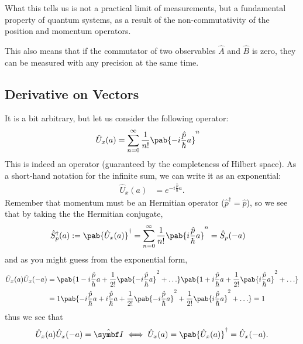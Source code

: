What this tells us is not a practical limit of measurements, but a fundamental property of quantum systems, as a result of the non-commutativity of the position and momentum operators.

This also means that if the commutator of two observables $\hat{A}$ and $\hat{B}$ is zero, they can be measured with any precision at the same time.



\subsection{Derivative on Vectors}
It is a bit arbitrary, but let us consider the following operator:
\begin{align}
  \hat{U}_x (a) & = \sum_{n=0}^{\infty} \frac{1}{n!} \pab{- i \frac{\hat{p}}{\hbar} a}^n
\end{align}
This is indeed an operator (guaranteed by the completeness of Hilbert space).
As a short-hand notation for the infinite sum, we can write it as an exponential:
\begin{align}
  \hat{U}_x (a) & = e^{- i \frac{\hat{p}}{\hbar} a}.
\end{align}
Remember that momentum must be an Hermitian operator ($\hat{p}^\dagger = \hat{p}$), so we  see that by taking the the Hermitian conjugate,
\begin{align}
  \hat{S}^\dagger_p (a): = \pab{\hat{U}_x (a)}^\dagger & = \sum_{n=0}^{\infty} \frac{1}{n!} \pab{i \frac{\hat{p}}{\hbar} a}^n = \hat{S}_{p} (- a)
\end{align}
and as you might guess from the exponential form,
\begin{align}
  \hat{U}_x(a) \hat{U}_x (-a)
   & = \pab{1 - i \frac{\hat{p}}{h} a + \frac{1}{2!} \pab{- i \frac{\hat{p}}{\hbar} a}^2 + \ldots} \pab{1 + i \frac{\hat{p}}{\hbar} a + \frac{1}{2!} \pab{i \frac{\hat{p}}{\hbar} a}^2 + \ldots} \\
   & = 1 \pab{- i \frac{\hat{p}}{\hbar} a + i \frac{\hat{p}}{\hbar} a + \frac{1}{2!} \pab{- i \frac{\hat{p}}{\hbar} a}^2 + \frac{1}{2!} \pab{i \frac{\hat{p}}{\hbar} a}^2 + \ldots} = 1
\end{align}
thus we see that
\begin{align}
  \hat{U}_x(a) \hat{U}_x (-a) = \idty \iff \hat{U}_x (a) = \pab{\hat{U}_x(a)}^\dagger = \hat{U}_x (-a).
\end{align}
